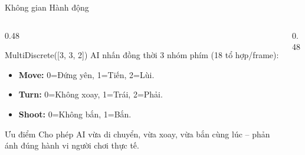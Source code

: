 \documentclass[aspectratio=169]{beamer}
\begin{document}
\begin{frame}{Không gian Hành động}
  \begin{columns}[T]
    \begin{column}{0.48\textwidth}
      \begin{block}{MultiDiscrete([3, 3, 2])}
        AI nhấn đồng thời 3 nhóm phím (18 tổ hợp/frame):
        \begin{itemize}
          \item \textbf{Move:} 0=Đứng yên, 1=Tiến, 2=Lùi.
          \item \textbf{Turn:} 0=Không xoay, 1=Trái, 2=Phải.
          \item \textbf{Shoot:} 0=Không bắn, 1=Bắn.
        \end{itemize}
      \end{block}
      \vspace{0.3em}
      \begin{exampleblock}{Ưu điểm}
        Cho phép AI vừa di chuyển, vừa xoay, vừa bắn cùng lúc -- phản ánh đúng hành vi người chơi thực tế.
      \end{exampleblock}
    \end{column}
    \begin{column}{0.48\textwidth}
      \begin{center}
      \end{center}
    \end{column}
  \end{columns}
\end{frame}
\end{document}
